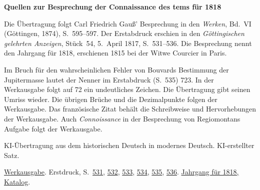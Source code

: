 \clearpage\thispagestyle{empty}
\begin{center}\Large\bfseries Quellen zur Besprechung der Connaissance des tems für 1818\end{center}

Die Übertragung folgt Carl Friedrich Gauß’ Besprechung in den \emph{Werken}, Bd.~VI (Göttingen, 1874), S.~595--597. Der Erstabdruck erschien in den \emph{Göttingischen gelehrten Anzeigen}, Stück~54, 5.~April 1817, S.~531--536. Die Besprechung nennt den Jahrgang für 1818, erschienen 1815 bei der Witwe Courcier in Paris.

Im Bruch für den wahrscheinlichen Fehler von Bouvards Bestimmung der Jupitermasse lautet der Nenner im Erstabdruck (S.~535) 723. In der Werkausgabe folgt auf 72 ein undeutliches Zeichen. Die Übertragung gibt seinen Umriss wieder. Die übrigen Brüche und die Dezimalpunkte folgen der Werkausgabe. Das französische Zitat behält die Schreibweise und Hervorhebungen der Werkausgabe. Auch \emph{Connoissance} in der Besprechung von Regiomontans Aufgabe folgt der Werkausgabe.

KI-Übertragung aus dem historischen Deutsch in modernes Deutsch. KI-erstellter Satz.

\href{https://gdz.sub.uni-goettingen.de/id/PPN236007467}{Werkausgabe}. Erstdruck, S.~\href{https://images.p.sub.uni-goettingen.de/iiif/image/gdz:PPN319721507_1817:00000541/full/1650,/0/default.jpg}{531}, \href{https://images.p.sub.uni-goettingen.de/iiif/image/gdz:PPN319721507_1817:00000542/full/1650,/0/default.jpg}{532}, \href{https://images.p.sub.uni-goettingen.de/iiif/image/gdz:PPN319721507_1817:00000543/full/1650,/0/default.jpg}{533}, \href{https://images.p.sub.uni-goettingen.de/iiif/image/gdz:PPN319721507_1817:00000544/full/1650,/0/default.jpg}{534}, \href{https://images.p.sub.uni-goettingen.de/iiif/image/gdz:PPN319721507_1817:00000545/full/1650,/0/default.jpg}{535}, \href{https://images.p.sub.uni-goettingen.de/iiif/image/gdz:PPN319721507_1817:00000546/full/1650,/0/default.jpg}{536}. \href{https://cdt.imcce.fr/items/show/167}{Jahrgang für 1818, Katalog}.

\clearpage
